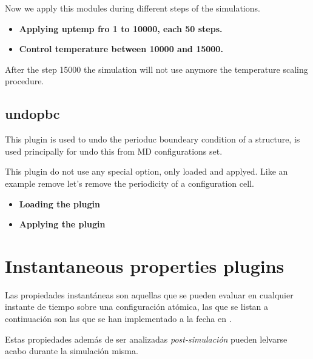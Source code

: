 Now we apply this modules during different steps of the simulations.

\begin{itemize}
 \item \textbf{Applying \textbf{uptemp} fro 1 to 10000, each 50 steps.}
 \item \textbf{Control temperature between 10000 and 15000.}
\end{itemize}

After the step 15000 the simulation will not use anymore the temperature
scaling procedure.

\subsection{undopbc}
This plugin is used to undo the perioduc boundeary condition of a structure, is
used principally for undo this from MD configurations set.

This plugin do not use any special option, only loaded and applyed. Like an
example remove let's remove the periodicity of a configuration cell.

\begin{itemize}
 \item \textbf{Loading the plugin}
 \item \textbf{Applying the plugin}
\end{itemize}


\section{Instantaneous properties plugins}
Las propiedades instant\'aneas son aquellas que se pueden evaluar en cualquier
instante de tiempo sobre una configuraci\'on at\'omica, las que se listan a
continuaci\'on son las que se han implementado a la fecha en {\lpmd}.

Estas propiedades adem\'as de ser analizadas \textit{post-simulaci\'on} pueden
lelvarse acabo durante la simulaci\'on misma.

